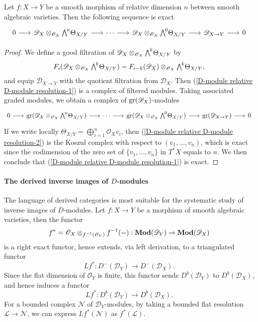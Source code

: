 \begin{proposition}\label{D-module relative D-module resolution}
Let $f:X\to Y$ be a smooth morphism of relative dimension $n$ between smooth algebraic varieties. Then the following sequence is exact 
\begin{equation}\label{D-module relative D-module resolution-1}
\begin{tikzcd}[column sep=6mm]
0\ar[r]&\mathscr{D}_X\otimes_{\mathscr{O}_X}\bigw^n\Theta_{X/Y}\ar[r]&\cdots\ar[r]&\mathscr{D}_X\otimes_{\mathscr{O}_X}\bigw^0\Theta_{X/Y}\ar[r]&\mathscr{D}_{X\to Y}\ar[r]&0
\end{tikzcd}
\end{equation}
\end{proposition}
\begin{proof}
We define a good filtration of $\mathscr{D}_X\otimes_{\mathscr{O}_X}\bigw^k\Theta_{X/Y}$ by
\[F_i(\mathscr{D}_X\otimes_{\mathscr{O}_X}\bigw^k\Theta_{X/Y})=F_{i-k}(\mathscr{D}_X)\otimes_{\mathscr{O}_X}\bigw^k\Theta_{X/Y},\]
and equip $\mathscr{D}_{X\to Y}$ with the quotient filtration from $\mathscr{D}_X$. Then (\ref{D-module relative D-module resolution-1}) is a complex of filtered modules. Taking associated graded modules, we obtain a complex of $\mathrm{gr}(\mathscr{D}_X)$-modules
\begin{equation}\label{D-module relative D-module resolution-2}
\begin{tikzcd}[column sep=6mm]
0\ar[r]&\gr(\mathscr{D}_X\otimes_{\mathscr{O}_X}\bigw^n\Theta_{X/Y})\ar[r]&\cdots\ar[r]&\gr(\mathscr{D}_X\otimes_{\mathscr{O}_X}\bigw^0\Theta_{X/Y})\ar[r]&\gr(\mathscr{D}_{X\to Y})\ar[r]&0
\end{tikzcd}
\end{equation}
If we write locally $\Theta_{X/Y}=\bigoplus_{i=1}^{n}\mathscr{O}_Xv_i$, then (\ref{D-module relative D-module resolution-2}) is the Koszul complex with respect to $(v_1,\dots,v_n)$, which is exact since the codimension of the zero set of $\{v_1,\dots,v_n\}$ in $T^*X$ equals to $n$. We then conclude that (\ref{D-module relative D-module resolution-1}) is exact.
\end{proof}

\paragraph{The derived inverse images of \texorpdfstring{$D$}{D}-modules}
The language of derived categories is most suitable for the systematic study of inverse images of $D$-modules. Let $f:X\to Y$ be a morphism of smooth algebraic varieties, then the functor
\[f^*=\mathscr{O}_X\otimes_{f^{-1}(\mathscr{O}_Y)}f^{-1}(-):\mathbf{Mod}(\mathscr{D}_Y)\to\mathbf{Mod}(\mathscr{D}_X)\]
is a right exact functor, hence extends, via left derivation, to a triangulated functor
\[Lf^*:D^-(\mathscr{D}_Y)\to D^-(\mathscr{D}_X).\]
Since the flat dimension of $\mathscr{O}_Y$ is finite, this functor sends $D^b(\mathscr{D}_Y)$ to $D^b(\mathscr{D}_X)$, and hence induces a functor
\[Lf^*:D^b(\mathscr{D}_Y)\to D^b(\mathscr{D}_X).\]
For a bounded complex $\mathscr{N}$ of $\mathscr{D}_Y$-modules, by taking a bounded flat resolution $\mathscr{L}\to\mathscr{N}$, we can express $Lf^*(\mathscr{N})$ as $f^*(\mathscr{L})$.

